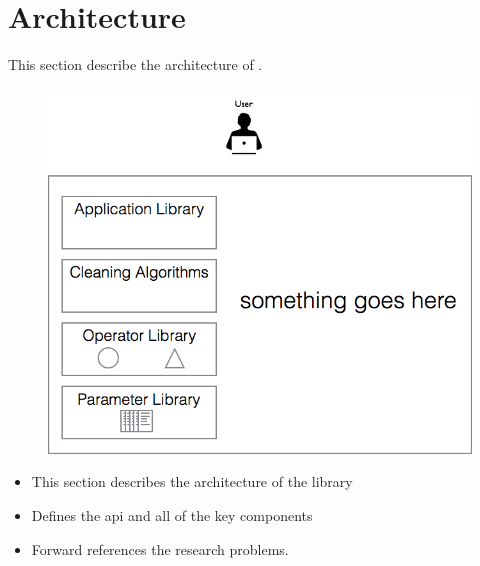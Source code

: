 \section{Architecture}

This section describe the architecture of \sys.

\begin{figure}[ht]
  \centering
  \includegraphics[width=.95\columnwidth]{figs/arch}
  \caption{}
  \label{f:arch}
\end{figure}


\begin{itemize}
    \item This section describes the architecture of the library
    \item Defines the api and all of the key components
    \item Forward references the research problems.
\end{itemize}